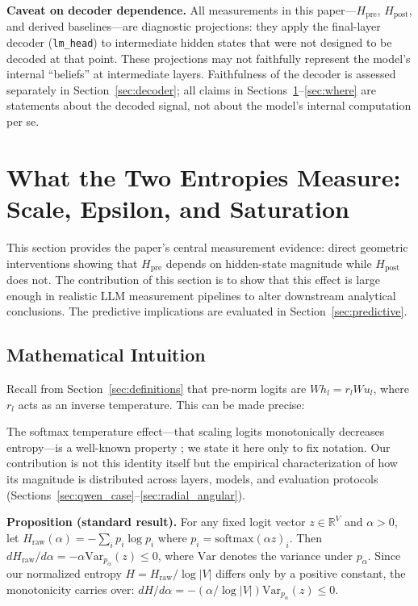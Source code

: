 \documentclass{ieeeaccess}
\newcommand{\Hpre}{H_{\text{pre}}}
\newcommand{\Hpost}{H_{\text{post}}}
\begin{document}
\textbf{Caveat on decoder dependence.} All measurements in this paper---$\Hpre$, $\Hpost$, and derived baselines---are diagnostic projections: they apply the final-layer decoder (\texttt{lm\_head}) to intermediate hidden states that were not designed to be decoded at that point. These projections may not faithfully represent the model's internal ``beliefs'' at intermediate layers. Faithfulness of the decoder is assessed separately in Section~\ref{sec:decoder}; all claims in Sections~\ref{sec:what}--\ref{sec:where} are statements about the decoded signal, not about the model's internal computation per se.


\section{What the Two Entropies Measure: Scale, Epsilon, and Saturation}
\label{sec:what}

This section provides the paper's central measurement evidence: direct geometric interventions showing that $\Hpre$ depends on hidden-state magnitude while $\Hpost$ does not. The contribution of this section is to show that this effect is large enough in realistic LLM measurement pipelines to alter downstream analytical conclusions. The predictive implications are evaluated in Section~\ref{sec:predictive}.

\subsection{Mathematical Intuition}
\label{sec:math_intuition}

Recall from Section~\ref{sec:definitions} that pre-norm logits are $W h_l = r_l W u_l$, where $r_l$ acts as an inverse temperature. This can be made precise:

The softmax temperature effect---that scaling logits monotonically decreases entropy---is a well-known property \cite{geva2022transformer}; we state it here only to fix notation. Our contribution is not this identity itself but the empirical characterization of how its magnitude is distributed across layers, models, and evaluation protocols (Sections~\ref{sec:qwen_case}--\ref{sec:radial_angular}).

\textbf{Proposition (standard result).} For any fixed logit vector $z \in \mathbb{R}^V$ and $\alpha > 0$, let $H_{\text{raw}}(\alpha) = -\sum_i p_i \log p_i$ where $p_i = \text{softmax}(\alpha z)_i$. Then $dH_{\text{raw}}/d\alpha = -\alpha \text{Var}_{p_\alpha}(z) \leq 0$, where $\text{Var}$ denotes the variance under $p_\alpha$. Since our normalized entropy $H = H_{\text{raw}} / \log|V|$ differs only by a positive constant, the monotonicity carries over: $dH/d\alpha = -(\alpha / \log|V|) \text{Var}_{p_\alpha}(z) \leq 0$.
\end{document}

